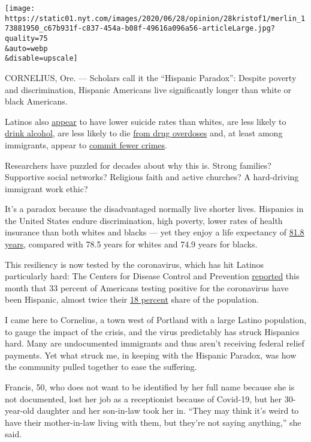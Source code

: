 \texttt{[image: https://static01.nyt.com/images/2020/06/28/opinion/28kristof1/merlin\_173881950\_c67b931f-c837-454a-b08f-49616a096a56-articleLarge.jpg?quality=75\\\&auto=webp\\\&disable=upscale]}

CORNELIUS, Ore. --- Scholars call it the ``Hispanic Paradox'': Despite
poverty and discrimination, Hispanic Americans live significantly longer
than white or black Americans.

Latinos also
\href{https://www.cdc.gov/nchs/data/series/sr_02/sr02_172.pdf}{appear}
to have lower suicide rates than whites, are less likely to
\href{https://www.niaaa.nih.gov/publications/brochures-and-fact-sheets/alcohol-and-hispanic-community}{drink
alcohol}, are less likely to die
\href{https://www.cdc.gov/mmwr/volumes/69/wr/mm6911a4.htm\#T1_down}{from
drug overdoses} and, at least among immigrants, appear to
\href{https://www.politifact.com/factchecks/2017/aug/03/antonio-villaraigosa/mostly-true-undocumented-immigrants-less-likely-co/}{commit
fewer crimes}.

Researchers have puzzled for decades about why this is. Strong families?
Supportive social networks? Religious faith and active churches? A
hard-driving immigrant work ethic?

It's a paradox because the disadvantaged normally live shorter lives.
Hispanics in the United States endure discrimination, high poverty,
lower rates of health insurance than both whites and blacks --- yet they
enjoy a life expectancy of
\href{https://www.cdc.gov/nchs/data/nvsr/nvsr68/nvsr68_07-508.pdf}{81.8
years}, compared with 78.5 years for whites and 74.9 years for blacks.

This resiliency is now tested by the coronavirus, which has hit Latinos
particularly hard: The Centers for Disease Control and Prevention
\href{https://www.cdc.gov/mmwr/volumes/69/wr/mm6924e2.htm?s_cid=mm6924e2_w}{reported}
this month that 33 percent of Americans testing positive for the
coronavirus have been Hispanic, almost twice their
\href{https://www.census.gov/quickfacts/fact/table/US/RHI725218}{18
percent} share of the population.

I came here to Cornelius, a town west of Portland with a large Latino
population, to gauge the impact of the crisis, and the virus predictably
has struck Hispanics hard. Many are undocumented immigrants and thus
aren't receiving federal relief payments. Yet what struck me, in keeping
with the Hispanic Paradox, was how the community pulled together to ease
the suffering.

Francis, 50, who does not want to be identified by her full name because
she is not documented, lost her job as a receptionist because of
Covid-19, but her 30-year-old daughter and her son-in-law took her in.
``They may think it's weird to have their mother-in-law living with
them, but they're not saying anything,'' she said.

